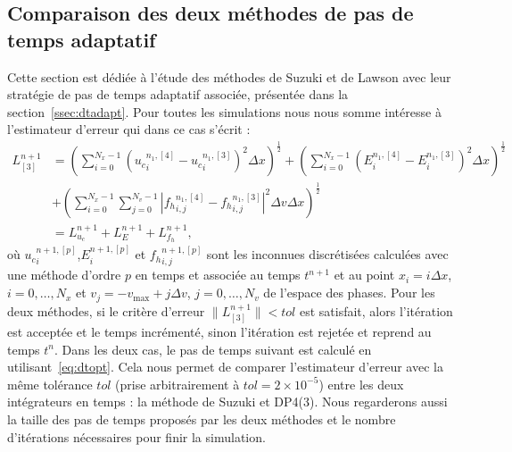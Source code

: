 \FloatBarrier

\subsection{Comparaison des deux méthodes de pas de temps adaptatif}

Cette section est dédiée à l'étude des méthodes de Suzuki et de Lawson avec leur stratégie de pas de temps adaptatif associée, présentée dans la section~\ref{ssec:dtadapt}. Pour toutes les simulations nous nous somme intéresse à l'estimateur d'erreur qui dans ce cas s'écrit :
\begin{equation}
  \begin{aligned}
    L^{n+1}_{[3]} & = \left(\sum_{i=0}^{N_x-1}\left( {u_c}_i^{n_1,[4]}-{u_c}_i^{n_1,[3]} \right)^2\Delta x\right)^{\frac{1}{2}}
                    + \left(\sum_{i=0}^{N_x-1}\left( {E}_i^{n_1,[4]}-{E}_i^{n_1,[3]} \right)^2\Delta x\right)^{\frac{1}{2}} \\
                  & + \left(\sum_{i=0}^{N_x-1}\sum_{j=0}^{N_v-1}\left| {f_h}_{i,j}^{n_1,[4]}-{f_h}_{i,j}^{n_1,[3]} \right|^2\Delta v\Delta x\right)^{\frac{1}{2}} \\
                  & = L_{u_c}^{n+1} + L_{E}^{n+1} + L_{f_h}^{n+1},
  \end{aligned}
  \label{eq:LucEfh:localerror}
\end{equation}
où ${u_c}_i^{n+1,[p]}$,${E}_i^{n+1,[p]}$ et ${f_h}_{i,j}^{n+1,[p]}$ sont les inconnues discrétisées calculées avec une méthode d'ordre $p$ en temps et associée au temps $t^{n+1}$ et au point $x_i=i\Delta x$, $i=0,\dots,N_x$ et $v_j = -v_\text{max} + j\Delta v$, $j=0,\dots,N_v$ de l'espace des phases. Pour les deux méthodes, si le critère d'erreur $\|L_{[3]}^{n+1}\|<tol$ est satisfait, alors l'itération est acceptée et le temps incrémenté, sinon l'itération est rejetée et reprend au temps $t^n$. Dans les deux cas, le pas de temps suivant est calculé en utilisant~\eqref{eq:dtopt}. Cela nous permet de comparer l'estimateur d'erreur avec la même tolérance $tol$ (prise arbitrairement à $tol=2\times10^{-5}$) entre les deux intégrateurs en temps : la méthode de Suzuki et DP4(3). Nous regarderons aussi la taille des pas de temps proposés par les deux méthodes et le nombre d'itérations nécessaires pour finir la simulation.

